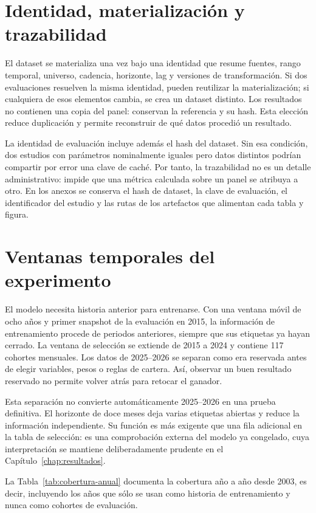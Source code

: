 \section{Identidad, materialización y trazabilidad}

El dataset se materializa una vez bajo una identidad que resume fuentes, rango temporal, universo,
cadencia, horizonte, lag y versiones de transformación. Si dos evaluaciones resuelven la misma
identidad, pueden reutilizar la materialización; si cualquiera de esos elementos cambia, se crea un
dataset distinto. Los resultados no contienen una copia del panel: conservan la referencia y su
hash. Esta elección reduce duplicación y permite reconstruir de qué datos procedió un resultado.

La identidad de evaluación incluye además el hash del dataset. Sin esa condición, dos estudios con
parámetros nominalmente iguales pero datos distintos podrían compartir por error una clave de caché.
Por tanto, la trazabilidad no es un detalle administrativo: impide que una métrica calculada sobre
un panel se atribuya a otro. En los anexos se conserva el hash de dataset, la clave de evaluación,
el identificador del estudio y las rutas de los artefactos que alimentan cada tabla y figura.

\section{Ventanas temporales del experimento}

El modelo necesita historia anterior para entrenarse. Con una ventana móvil de ocho años y primer
snapshot de la evaluación en 2015, la información de entrenamiento procede de periodos anteriores,
siempre que sus etiquetas ya hayan cerrado. La ventana de selección se extiende de 2015 a 2024 y
contiene 117 cohortes mensuales. Los datos de 2025--2026 se separan como era reservada antes de
elegir variables, pesos o reglas de cartera. Así, observar un buen resultado reservado no permite
volver atrás para retocar el ganador.

Esta separación no convierte automáticamente 2025--2026 en una prueba definitiva. El horizonte de
doce meses deja varias etiquetas abiertas y reduce la información independiente. Su función es más
exigente que una fila adicional en la tabla de selección: es una comprobación externa del modelo ya
congelado, cuya interpretación se mantiene deliberadamente prudente en el Capítulo~\ref{chap:resultados}.

La Tabla~\ref{tab:cobertura-anual} documenta la cobertura año a año desde 2003, es decir, incluyendo
los años que sólo se usan como historia de entrenamiento y nunca como cohortes de evaluación.

